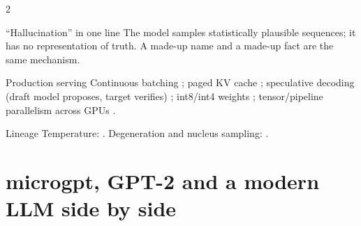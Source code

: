 \documentclass[10pt,letterpaper]{article}
\newcounter{q}
\begin{document}
\begin{multicols}{2}
\begin{csb}{``Hallucination'' in one line}
The model samples statistically plausible sequences; it has no representation of truth. A made-up name and a made-up fact are the same mechanism.
\end{csb}

\begin{csb}{Production serving}
Continuous batching \parencite{yu2022orca}; paged KV cache \parencite{kwon2023vllm}; speculative decoding (draft model proposes, target verifies) \parencite{leviathan2023speculative,chen2023speculative}; int8/int4 weights \parencite{dettmers2022int8,frantar2023gptq}; tensor/pipeline parallelism across GPUs \parencite{pope2022efficiently}.
\end{csb}

\begin{csb}{Lineage}
Temperature: \textcite{ackley1985boltzmann,hinton2015distilling}. Degeneration and nucleus sampling: \textcite{holtzman2020nucleus}.
\end{csb}
\end{multicols}

\clearpage
\section{microgpt, GPT-2 and a modern LLM side by side}
\end{document}
